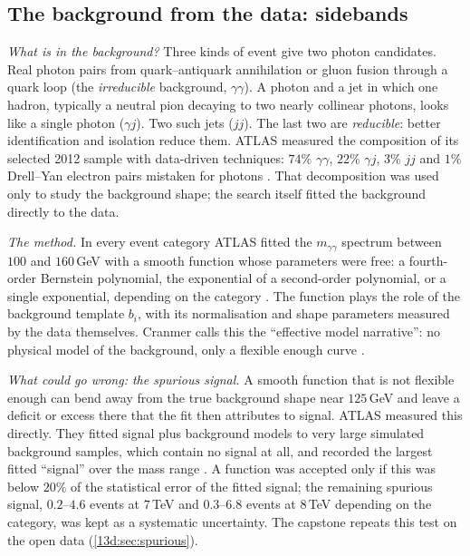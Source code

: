 \subsection{The background from the data: sidebands}
\label{T4a:sec:bkg-data}

\emph{What is in the background?} Three kinds of event give two photon candidates. Real photon pairs from quark--antiquark annihilation or gluon fusion through a quark loop (the \emph{irreducible} background, $\gamma\gamma$). A photon and a jet in which one hadron, typically a neutral pion decaying to two nearly collinear photons, looks like a single photon ($\gamma j$). Two such jets ($jj$). The last two are \emph{reducible}: better identification and isolation reduce them. ATLAS measured the composition of its selected 2012 sample with data-driven techniques: $74\%$ $\gamma\gamma$, $22\%$ $\gamma j$, $3\%$ $jj$ and $1\%$ Drell--Yan electron pairs mistaken for photons \cite[Sec.~5.2]{AadHiggs2012}. That decomposition was used only to study the background shape; the search itself fitted the background directly to the data.

\emph{The method.} In every event category ATLAS fitted the $m_{\gamma\gamma}$ spectrum between $100$ and $160$\,GeV with a smooth function whose parameters were free: a fourth-order Bernstein polynomial, the exponential of a second-order polynomial, or a single exponential, depending on the category \cite[Sec.~5.5]{AadHiggs2012}. The function plays the role of the background template $b_i$, with its normalisation and shape parameters measured by the data themselves. Cranmer calls this the ``effective model narrative'': no physical model of the background, only a flexible enough curve \cite[Secs.~4.2--4.3]{Cranmer2015}.

\emph{What could go wrong: the spurious signal.} A smooth function that is not flexible enough can bend away from the true background shape near $125$\,GeV and leave a deficit or excess there that the fit then attributes to signal. ATLAS measured this directly. They fitted signal plus background models to very large simulated background samples, which contain no signal at all, and recorded the largest fitted ``signal'' over the mass range \cite[Sec.~5.5]{AadHiggs2012}. A function was accepted only if this  was below $20\%$ of the statistical error of the fitted signal; the remaining spurious signal, $0.2$--$4.6$ events at $7$\,TeV and $0.3$--$6.8$ events at $8$\,TeV depending on the category, was kept as a systematic uncertainty. The capstone repeats this test on the open data (\cref{13d:sec:spurious}).

